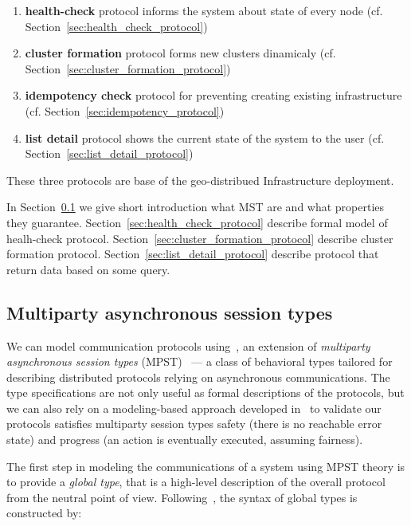 \begin{enumerate}[start=1,label={(\bfseries \arabic*)}]
	\item \textbf{health-check} protocol informs the system about state of every node (cf. Section~\ref{sec:health_check_protocol})
	\item \textbf{cluster formation} protocol forms new clusters dinamicaly (cf. Section~\ref{sec:cluster_formation_protocol})
	\item \textbf{idempotency check} protocol for preventing creating existing infrastructure (cf. Section~\ref{sec:idempotency_protocol})
	\item \textbf{list detail} protocol shows the current state of the system to the user (cf. Section~\ref{sec:list_detail_protocol})
\end{enumerate}

These three protocols are base of the geo-distribued Infrastructure deployment.

In Section~\ref{sec:multiparty} we give short introduction what MST are and what properties they guarantee. Section~\ref{sec:health_check_protocol} describe formal model of healh-check protocol. Section~\ref{sec:cluster_formation_protocol} describe cluster formation protocol. Section~\ref{sec:list_detail_protocol} describe protocol that return data based on some query.
%
%
\subsection{Multiparty asynchronous session types}\label{sec:multiparty}
%
We can model communication protocols %
using~\cite{HuY17}, an extension of \emph{multiparty asynchronous session types} (MPST)~\cite{HondaYC08} %
--- a class of behavioral types tailored for describing distributed protocols relying on asynchronous
communications. 
The type specifications are not only useful as formal descriptions of the protocols, but we can also rely on a modeling-based approach developed in~\cite{HuY17} to validate our protocols satisfies multiparty session types safety (there is no reachable error state) and progress (an action is eventually executed, assuming
fairness). %

The first step in modeling the communications of a system using MPST theory 
is to provide a \emph{global type}, that is a high-level description of the overall protocol from the neutral 
point of view. 
Following~\cite{HuY17}, the syntax of global types is constructed by:


